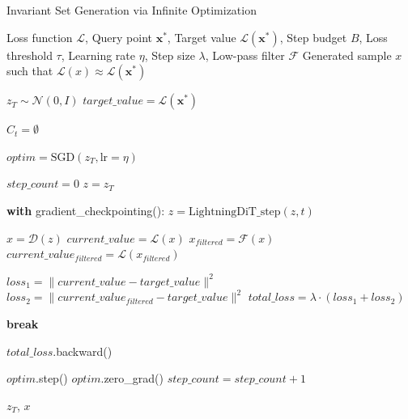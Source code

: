 \documentclass[licencjacka,en]{pracamgr}
\begin{document}
\begin{algorithm}[H]
\caption{Invariant Set Generation via Infinite Optimization}
\label{alg:invariant_generation}
\begin{algorithmic}[1]
\Require Loss function $\mathcal{L}$, Query point $\mathbf{x^*}$, Target value $\mathcal{L}(\mathbf{x^*})$, Step budget $B$, Loss threshold $\tau$, Learning rate $\eta$, Step size $\lambda$, Low-pass filter $\mathcal{F}$
\Ensure Generated sample $x$ such that $\mathcal{L}(x) \approx \mathcal{L}(\mathbf{x^*})$

\State $z_T \sim \mathcal{N}(0, I)$ 
\State $target\_value = \mathcal{L}(\mathbf{x^*})$ 

 
    \State $C_t = \emptyset$ 
\EndFor

\State $optim = \text{SGD}(z_T, \text{lr}=\eta)$ 

\State $step\_count = 0$ 
 
    \State $z = z_T$ 
    
     
        \State \textbf{with} gradient\_checkpointing():
        \State \quad $z = \text{LightningDiT\_step}(z, t)$ 
    \EndFor
    
    \State $x = \mathcal{D}(z)$ 
    \State $current\_value = \mathcal{L}(x)$ 
    \State $x_{filtered} = \mathcal{F}(x)$ 
    \State $current\_value_{filtered} = \mathcal{L}(x_{filtered})$ 
    
    \State $loss_1 = \|current\_value - target\_value\|^2$ 
    \State $loss_2 = \|current\_value_{filtered} - target\_value\|^2$ 
    \State $total\_loss = \lambda \cdot (loss_1 + loss_2)$ 
    
     
        \State \textbf{break} 
    \EndIf
    
    \State $total\_loss$.backward() 
    
    \State $optim$.step() 
    \State $optim$.zero\_grad() 
    \State $step\_count = step\_count + 1$ 
\EndWhile

\State \Return $z_T$, $x$ 
\end{algorithmic}
\end{algorithm}
\end{document}
